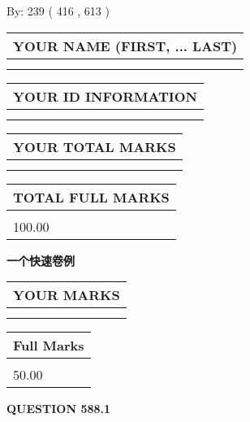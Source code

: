 \documentclass{ctexart}
\begin{document}
   
\hspace{1.0in} By: 
 239 ( 416 ,  613 )
   
   
   
   
\newpage 
\setcounter{page}{ 
   588001 } 
   
   
   
   
\noindent\begin{tabular}{|l|}
\hline
YOUR NAME (FIRST, ... LAST)  \\
\hline
 \\ 
 \\ 
\hline
\end{tabular}
\hspace{0.05in} \begin{tabular}{|l|}
\hline
 YOUR   ID   INFORMATION  \\
\hline
 \\ 
 \\ 
\hline
\end{tabular}
   
   
\vspace{0.2in}\noindent\begin{tabular}{|l|}
\hline
YOUR TOTAL MARKS  \\
\hline
 \\ 
 \\ 
\hline
\end{tabular}
\hspace{0.05in} \begin{tabular}{|l|}
\hline
TOTAL FULL MARKS  \\
\hline
 \\ 
100.00 \\
\hline
\end{tabular}
   
   
 \vspace{0.2in}
{\LARGE {\textbf{ 一个快速卷例}}}
   
   
  
\vspace{0.2in}
  
\noindent\begin{tabular}{|l|}
\hline
 YOUR MARKS  \\
\hline
 \\ 
 \\ 
\hline
\end{tabular}
\hspace{0.05in} \begin{tabular}{|l|}
\hline
 Full Marks  \\
\hline
 \\ 
50.00 \\
\hline
\end{tabular}
{\textbf{\Large{QUESTION
588.1 
}}}
  
\end{document}
